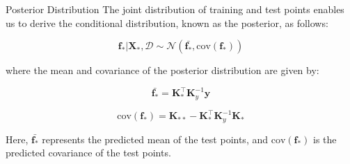 \begin{frame}{Posterior Distribution}
	\justifying
	The joint distribution of training and test points enables us to derive the conditional distribution, known as the posterior, as follows:
	
	\[
	\mathbf{f}_* | \mathbf{X}_*, \mathcal{D} \sim \mathcal{N}(\bar{\mathbf{f}_*}, \text{cov}(\mathbf{f}_*))
	\]
	
	\vspace{2mm}
	where the mean and covariance of the posterior distribution are given by:
	
	\vspace{2mm}
	\begin{equation*}\label{sogp_posterior_mean}
		\bar{\mathbf{f}_*} = \mathbf{K}_*^\top \mathbf{K}_y^{-1} \mathbf{y}
	\end{equation*}
	
	\vspace{2mm}
	\begin{equation*}\label{sogp_posterior_cov}
		\text{cov}(\mathbf{f}_*) = \mathbf{K}_{**} - \mathbf{K}_*^\top \mathbf{K}_y^{-1} \mathbf{K}_*
	\end{equation*}
	
	\vspace{2mm}
	Here, $\bar{\mathbf{f}_*}$ represents the predicted mean of the test points, and $\text{cov}(\mathbf{f}_*)$ is the predicted covariance of the test points.
\end{frame}


